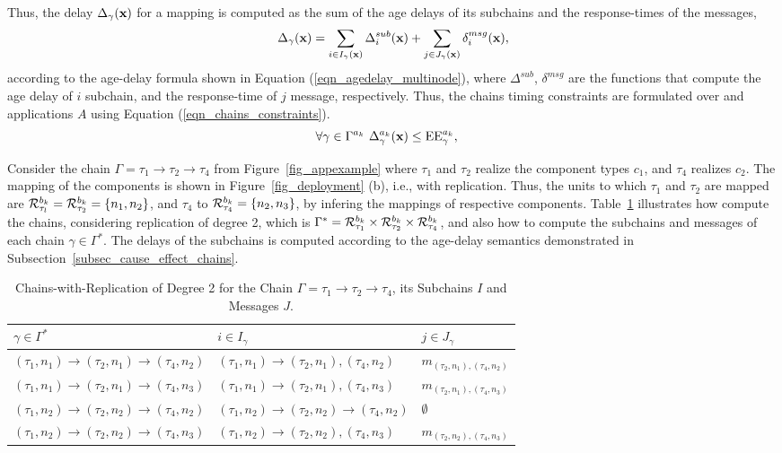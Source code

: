 Thus, the delay $\Delta_\gamma(\textbf{x})$ for a mapping \ttx is computed as the sum of the age delays of its subchains and the response-times of the messages,
\[
	\Delta_{\gamma}(\textbf{x})=\sum_{i\in I_{\gamma}(\textbf{x})}{\Delta^{sub}_{i}(\textbf{x})} + \sum_{j\in J_{\gamma}(\textbf{x})}{\delta^{msg}_i(\textbf{x})},
\]
according to the age-delay formula shown in Equation (\ref{eqn_agedelay_multinode}), where $\Delta^{sub}$, $\delta^{msg}$ are the functions that compute the age delay of $i$ subchain, and the response-time of $j$ message, respectively. Thus, the chains timing constraints are formulated over \ttx and applications $A$ using Equation (\ref{eqn_chains_constraints}).
\begin{align}
\label{eqn_chains_constraints}
\forall \gamma \in \ssp{\Gamma} \ \sss{\Delta}[k][{\gamma}](\x) & \leq \sss{\mathrm{EE}}[k][\gamma],
\end{align}
\begin{example} Consider the chain $\Gamma=\tau_1\rightarrow\tau_2\rightarrow\tau_4$ from Figure~\ref{fig_appexample} where $\tau_1$ and $\tau_2$ realize the component types $c_1$, and $\tau_4$ realizes $c_2$. The mapping of the components is shown in Figure~\ref{fig_deployment} (b), i.e., with replication. Thus, the units to which $\tau_1$ and $\tau_2$ are mapped are $\sss{\mathcal{R}}[k][\tau_l][b]=\sss{\mathcal{R}}[k][\tau_2][b]=\{n_1,n_2\}$, and $\tau_4$ to $\sss{\mathcal{R}}[k][\tau_4][b]=\{n_2,n_3\}$, by infering the mappings of respective components. Table~\ref{tbl_chains_with_replication} illustrates how compute the chains, considering replication of degree 2, which is $\Gamma^* = \sss{\mathcal{R}}[k][\tau_1][b] \times \sss{\mathcal{R}}[k][\tau_2][b] \times \sss{\mathcal{R}}[k][\tau_4][b]$, and also how to compute the subchains and messages of each chain $\gamma\in \Gamma^*$. The delays of the subchains is computed according to the age-delay semantics demonstrated in Subsection~\ref{subsec_cause_effect_chains}.
\end{example} 
\begin{table}[]
	\begin{tabular}{@{}lll@{}}
		\toprule
		$\gamma\in \Gamma^*$ & $i\in I_\gamma$ & $j\in J_\gamma$ \\ \midrule
		$(\tau_1,n_1)\rightarrow (\tau_2,n_1)\rightarrow(\tau_4,n_2)$ & $(\tau_1,n_1)\rightarrow (\tau_2,n_1),(\tau_4,n_2)$ & $m_{(\tau_2,n_1), (\tau_4,n_2)}$ \\
		$(\tau_1,n_1)\rightarrow (\tau_2,n_1)\rightarrow(\tau_4,n_3)$ & $(\tau_1,n_1)\rightarrow (\tau_2,n_1),(\tau_4,n_3)$ & $m_{(\tau_2,n_1), (\tau_4,n_3)}$ \\
		$(\tau_1,n_2)\rightarrow(\tau_2,n_2)\rightarrow(\tau_4,n_2)$ & $(\tau_1,n_2)\rightarrow(\tau_2,n_2)\rightarrow(\tau_4,n_2)$ & $\emptyset$ \\
		$(\tau_1,n_2)\rightarrow(\tau_2,n_2)\rightarrow(\tau_4,n_3)$ & $(\tau_1,n_2)\rightarrow(\tau_2,n_2),(\tau_4,n_3)$ & $m_{(\tau_2,n_2), (\tau_4,n_3)}$ \\ \bottomrule
	\end{tabular}
\caption{Chains-with-Replication of Degree 2 for the Chain $\Gamma=\tau_1\rightarrow\tau_2\rightarrow\tau_4$, its Subchains $I$ and Messages $J$.}
\label{tbl_chains_with_replication}
\end{table}

